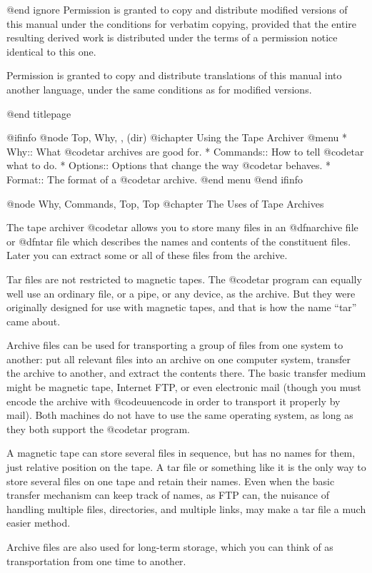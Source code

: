 @end ignore
Permission is granted to copy and distribute modified versions of this
manual under the conditions for verbatim copying, provided that the entire
resulting derived work is distributed under the terms of a permission
notice identical to this one.

Permission is granted to copy and distribute translations of this manual
into another language, under the same conditions as for modified versions.

@end titlepage

@ifinfo
@node Top, Why, , (dir)
@ichapter Using the Tape Archiver
@menu
* Why::			What @code{tar} archives are good for.
* Commands::		How to tell @code{tar} what to do.
* Options::		Options that change the way @code{tar} behaves.
* Format::		The format of a @code{tar} archive.
@end menu
@end ifinfo

@node Why, Commands, Top, Top
@chapter The Uses of Tape Archives

The tape archiver @code{tar} allows you to store many files in an
@dfn{archive file} or @dfn{tar file} which describes the names and contents
of the constituent files.  Later you can extract some or all of these files
from the archive.

Tar files are not restricted to magnetic tapes.  The @code{tar} program
can equally well use an ordinary file, or a pipe, or any device, as the
archive.  But they were originally designed for use with magnetic tapes,
and that is how the name ``tar'' came about.

Archive files can be used for transporting a group of files from one system
to another:  put all relevant files into an archive on one computer system,
transfer the archive to another, and extract the contents there.  The basic
transfer medium might be magnetic tape, Internet FTP, or even electronic
mail (though you must encode the archive with @code{uuencode} in order to
transport it properly by mail).  Both machines do not have to use the same
operating system, as long as they both support the @code{tar} program.

A magnetic tape can store several files in sequence, but has no names for
them, just relative position on the tape.  A tar file or something like it
is the only way to store several files on one tape and retain their names.
Even when the basic transfer mechanism can keep track of names, as FTP can,
the nuisance of handling multiple files, directories, and multiple links,
may make a tar file a much easier method.

Archive files are also used for long-term storage, which you can think
of as transportation from one time to another.

